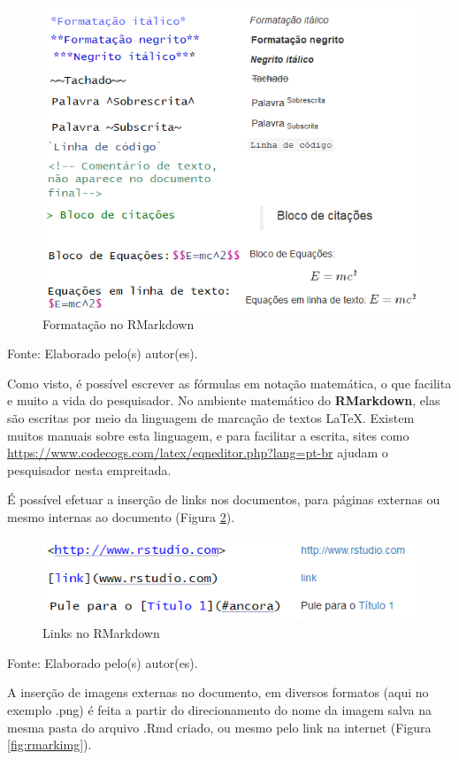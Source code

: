 \documentclass[12pt,brazil,oneside]{book}
\begin{document}
\begin{figure}[H]

{\centering \includegraphics[width=0.6\linewidth]{rmarkform} 

}

\caption{Formatação no RMarkdown}\label{fig:rmarkform}
\end{figure}

Fonte: Elaborado pelo(s) autor(es).

Como visto, é possível escrever as fórmulas em notação matemática, o que
facilita e muito a vida do pesquisador. No ambiente matemático do
\textbf{RMarkdown}, elas são escritas por meio da linguagem de marcação
de textos LaTeX. Existem muitos manuais sobre esta linguagem, e para
facilitar a escrita, sites como
\url{https://www.codecogs.com/latex/eqneditor.php?lang=pt-br} ajudam o
pesquisador nesta empreitada.

É possível efetuar a inserção de links nos documentos, para páginas
externas ou mesmo internas ao documento (Figura \ref{fig:rmarklinks}).

\begin{figure}[H]

{\centering \includegraphics[width=0.6\linewidth]{rmarklinks} 

}

\caption{Links no RMarkdown}\label{fig:rmarklinks}
\end{figure}

Fonte: Elaborado pelo(s) autor(es).

A inserção de imagens externas no documento, em diversos formatos (aqui
no exemplo .png) é feita a partir do direcionamento do nome da imagem
salva na mesma pasta do arquivo .Rmd criado, ou mesmo pelo link na
internet (Figura \ref{fig:rmarkimg}).
\end{document}
